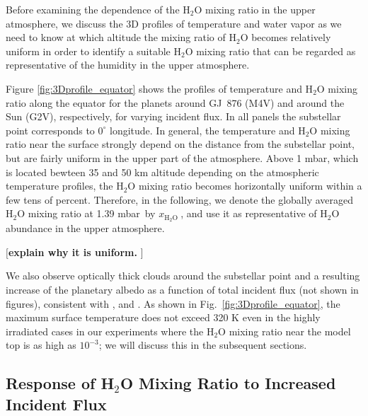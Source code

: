 \documentclass[11pt,numberedappendix,twocolappendix,]{emulateapj}
\def\water{H$_2$O }
\def\xwater{\dsa{$x_\text{\water}$}}
\def\preslevel{1.39 mbar\ }
\def\memo#1{\color{red}$[${\bf #1}$]$ \color{black}}
\newcommand{\dsa}[1]{{\color{blue}#1}}
\begin{document}
Before examining the dependence of the \water mixing ratio in the upper atmosphere, we discuss the 3D profiles of temperature and water vapor as we need to know at which altitude the mixing ratio of \water becomes relatively uniform in order to identify a suitable \water mixing ratio that can be regarded as representative of the humidity in the upper atmosphere. 

Figure \ref{fig:3Dprofile_equator} shows the profiles of temperature and \water mixing ratio along the equator for the planets around GJ~876 (M4V) and around the Sun (G2V), respectively, for varying incident flux. 
In all panels the substellar point corresponds to $0^{\circ }$ longitude. 
In general, the temperature and \water mixing ratio near the surface strongly depend on the distance from the substellar point, but are fairly uniform in the upper part of the atmosphere. 
Above 1 mbar, which is located bewteen 35 and 50 km altitude depending on the atmospheric temperature profiles, the \water mixing ratio becomes horizontally uniform within a few tens of percent. 
Therefore, in the following, we denote the globally averaged \water mixing ratio at \preslevel by \xwater, and use it as representative of \water abundance in the upper atmosphere. 

\memo{explain why it is uniform. }

We also observe optically thick clouds around the substellar point and a resulting increase of the planetary albedo as a function of total incident flux (not shown in figures), consistent with \citet{Yang2013,Yang2014}, \citet{Kopparapu2016} and \citet{Way2016}. 
As shown in Fig.~\ref{fig:3Dprofile_equator}, the maximum surface temperature does not exceed 320 K even in the highly irradiated cases in our experiments where the \water mixing ratio near the model top is as high as $10^{-3}$; we will discuss this in the subsequent sections. 


\subsection{Response of \water Mixing Ratio to Increased Incident Flux}
\label{ss:result_H2Omixingratio}
\end{document}
